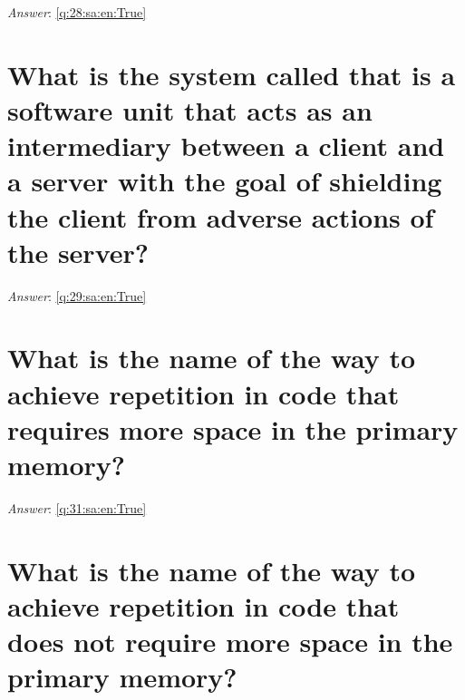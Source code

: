 \documentclass[a4paper,11pt,oneside]{book}
\begin{document}
\begin{sloppypar}
\label{q:28:sa:en:False}

\vspace{2cm}

\noindent\makebox[\textwidth]{\hrulefill}

\vspace{1cm}

\textit{Answer}: \autoref{q:28:sa:en:True}



\section{What is the system called that is a software unit that acts as an intermediary between a client and a server with the goal of shielding the client from adverse actions of the server?}

\label{q:29:sa:en:False}

\vspace{2cm}

\noindent\makebox[\textwidth]{\hrulefill}

\vspace{1cm}

\textit{Answer}: \autoref{q:29:sa:en:True}



\section{What is the name of the way to achieve repetition in code that requires more space in the primary memory?}

\label{q:31:sa:en:False}

\vspace{2cm}

\noindent\makebox[\textwidth]{\hrulefill}

\vspace{1cm}

\textit{Answer}: \autoref{q:31:sa:en:True}



\section{What is the name of the way to achieve repetition in code that does not require more space in the primary memory?}

\label{q:32:sa:en:False}

\vspace{2cm}

\noindent\makebox[\textwidth]{\hrulefill}


\end{sloppypar}
\end{document}
